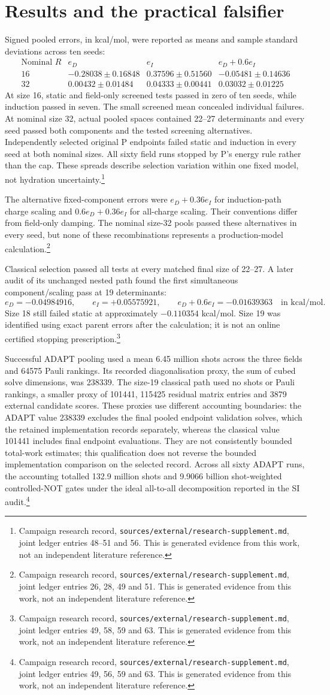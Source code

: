 \documentclass{article}
\newcommand{\record}[1]{\footnote{Campaign research record, \texttt{sources/external/research-supplement.md}, #1. This is generated evidence from this work, not an independent literature reference.}}
\begin{document}
\section{Results and the practical falsifier}
Signed pooled errors, in kcal/mol, were reported as means and sample standard deviations across ten seeds:
\[
\begin{array}{c|rrr}
 \text{Nominal }R&e_D&e_I&e_D+0.6e_I\\ \hline
16&-0.28038\pm0.16848&0.37596\pm0.51560&-0.05481\pm0.14636\\
32&0.00432\pm0.01484&0.04333\pm0.00441&0.03032\pm0.01225
\end{array}
\]
At size 16, static and field-only screened tests passed in zero of ten seeds, while induction passed in seven. The small screened mean concealed individual failures. At nominal size 32, actual pooled spaces contained 22--27 determinants and every seed passed both components and the tested screening alternatives. Independently selected original P endpoints failed static and induction in every seed at both nominal sizes. All sixty field runs stopped by P's energy rule rather than the cap. These spreads describe selection variation within one fixed model, not hydration uncertainty.\record{joint ledger entries 48--51 and 56}

The alternative fixed-component errors were \(e_D+0.36e_I\) for induction-path charge scaling and \(0.6e_D+0.36e_I\) for all-charge scaling. Their conventions differ from field-only damping. The nominal size-32 pools passed these alternatives in every seed, but none of these recombinations represents a production-model calculation.\record{joint ledger entries 26, 28, 49 and 51}

Classical selection passed all tests at every matched final size of 22--27. A later audit of its unchanged nested path found the first simultaneous component/scaling pass at 19 determinants:
\[
 e_D=-0.04984916,\qquad e_I=+0.05575921,\qquad
 e_D+0.6e_I=-0.01639363
 \quad\text{in kcal/mol}.
\]
Size 18 still failed static at approximately \(-0.110354\) kcal/mol. Size 19 was identified using exact parent errors after the calculation; it is not an online certified stopping prescription.\record{joint ledger entries 49, 58, 59 and 63}

Successful ADAPT pooling used a mean 6.45 million shots across the three fields and 64575 Pauli rankings. Its recorded diagonalisation proxy, the sum of cubed solve dimensions, was 238339. The size-19 classical path used no shots or Pauli rankings, a smaller proxy of 101441, 115425 residual matrix entries and 3879 external candidate scores. These proxies use different accounting boundaries: the ADAPT value 238339 excludes the final pooled endpoint validation solves, which the retained implementation records separately, whereas the classical value 101441 includes final endpoint evaluations. They are not consistently bounded total-work estimates; this qualification does not reverse the bounded implementation comparison on the selected record. Across all sixty ADAPT runs, the accounting totalled 132.9 million shots and 9.9066 billion shot-weighted controlled-NOT gates under the ideal all-to-all decomposition reported in the SI audit.\record{joint ledger entries 49, 56, 59 and 63}
\end{document}
